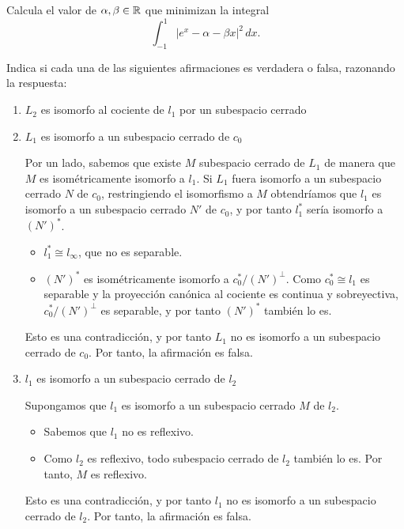 \documentclass[12pt]{article}
\begin{document}
    \begin{ejercicio}
        Calcula el valor de $\alpha, \beta \in \mathbb{R}$ que minimizan la integral
        \[
            \int_{-1}^1 |e^x - \alpha - \beta x|^2 \, dx.
        \]
    \end{ejercicio}

    \begin{ejercicio}
        Indica si cada una de las siguientes afirmaciones es verdadera o falsa, razonando la respuesta:
        \begin{enumerate}[label=(\roman*)]
            \item $L_2$ es isomorfo al cociente de $l_1$ por un subespacio cerrado
            \item $L_1$ es isomorfo a un subespacio cerrado de $c_0$
            
            Por un lado, sabemos que existe $M$ subespacio cerrado de $L_1$ de manera que $M$ es isométricamente isomorfo a $l_1$. Si $L_1$ fuera isomorfo a un subespacio cerrado $N$ de $c_0$, restringiendo el isomorfismo a $M$ obtendríamos que $l_1$ es isomorfo a un subespacio cerrado $N'$ de $c_0$, y por tanto $l_1^*$ sería isomorfo a $(N')^*$.
            \begin{itemize}
                \item $l_1^* \cong l_\infty$, que no es separable.
                \item $(N')^*$ es isométricamente isomorfo a $c_0^*/(N')^\perp$. Como $c_0^*\cong l_1$ es separable y la proyección canónica al cociente es continua y sobreyectiva, $c_0^*/(N')^\perp$ es separable, y por tanto $(N')^*$ también lo es. 
            \end{itemize}

            Esto es una contradicción, y por tanto $L_1$ no es isomorfo a un subespacio cerrado de $c_0$. Por tanto, la afirmación es falsa.
            \item $l_1$ es isomorfo a un subespacio cerrado de $l_2$
            
            Supongamos que $l_1$ es isomorfo a un subespacio cerrado $M$ de $l_2$.
            \begin{itemize}
                \item Sabemos que $l_1$ no es reflexivo.
                \item Como $l_2$ es reflexivo, todo subespacio cerrado de $l_2$ también lo es. Por tanto, $M$ es reflexivo.
            \end{itemize}

            Esto es una contradicción, y por tanto $l_1$ no es isomorfo a un subespacio cerrado de $l_2$. Por tanto, la afirmación es falsa.
        \end{enumerate}
    \end{ejercicio}
\end{document}
